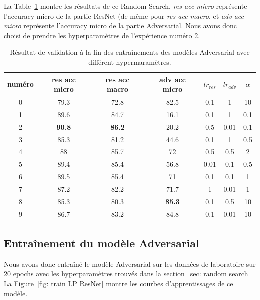 \documentclass[a4paper]{article}
\begin{document}
La Table~\ref{tab:random search results} montre les résultats de ce Random Search. \textit{res acc micro} représente l'accuracy micro de la partie ResNet (de même pour \textit{res acc macro}, et \textit{adv acc micro} représente l'accuracy micro de la partie Adversarial. Nous avons donc choisi de prendre les hyperparamètres de l'expérience numéro 2.

\begin{table}[ht]
    \centering
    \begin{tabular}{ccccccc}
    \toprule
    numéro & res acc micro & res acc macro & adv acc micro & $lr_{res}$ & $lr_{adv}$ & $\alpha$ \\
    \midrule
    0 & 79.3 & 72.8 & 82.5 & 0.1 & 1 & 10 \\
    1 & 89.6 & 84.7 & 16.1 & 0.1 & 1 & 0.1 \\
    2 & \textbf{90.8} & \textbf{86.2} & 20.2 & 0.5 & 0.01 & 0.1 \\
    3 & 85.3 & 81.2 & 44.6 & 0.1 & 1 & 0.5 \\
    4 & 88 & 85.7 & 72 & 0.5 & 0.5 & 2 \\
    5 & 89.4 & 85.4 & 56.8 & 0.01 & 0.1 & 0.5 \\
    6 & 89.5 & 85.4 & 71 & 0.1 & 0.1 & 1 \\
    7 & 87.2 & 82.2 & 71.7 & 1 & 0.01 & 1 \\
    8 & 85.3 & 80.3 & \textbf{85.3} & 0.1 & 0.5 & 10 \\
    9 & 86.7 & 83.2 & 84.8 & 0.1 & 0.01 & 10 \\
    \bottomrule
    \end{tabular}
    \caption{Résultat de validation à la fin des entraînements des modèles Adversarial avec différent hypermaramètres.}
    \label{tab:random search results}
\end{table}

\subsection{Entraînement du modèle Adversarial}
Nous avons donc entraîné le modèle Adversarial sur les données de laboratoire sur 20 epochs avec les hyperparamètres trouvés dans la section~\ref{sec: random search} La Figure~\ref{fig: train LP ResNet} montre les courbes d'apprentissages de ce modèle.
\end{document}
